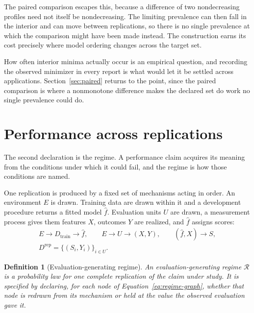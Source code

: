 \documentclass[11pt]{article}
\newcommand{\Regime}{\mathcal{R}}
\newtheorem{definition}{Definition}
\theoremstyle{remark}
\begin{document}
The paired comparison escapes this, because a difference of two nondecreasing profiles need not itself be nondecreasing. The limiting prevalence can then fall in the interior and can move between replications, so there is no single prevalence at which the comparison might have been made instead. The construction earns its cost precisely where model ordering changes across the target set.

How often interior minima actually occur is an empirical question, and recording the observed minimizer in every report is what would let it be settled across applications. Section~\ref{sec:paired} returns to the point, since the paired comparison is where a nonmonotone difference makes the declared set do work no single prevalence could do.

\section{Performance across replications}
\label{sec:regime}

The second declaration is the regime. A performance claim acquires its meaning from the conditions under which it could fail, and the regime is how those conditions are named.

One replication is produced by a fixed set of mechanisms acting in order. An environment $E$ is drawn. Training data are drawn within it and a development procedure returns a fitted model $\widehat f$. Evaluation units $U$ are drawn, a measurement process gives them features $X$, outcomes $Y$ are realized, and $\widehat f$ assigns scores:
\begin{equation}
\begin{gathered}
E\longrightarrow D_{\mathrm{train}}\longrightarrow\widehat f,
\qquad
E\longrightarrow U\longrightarrow(X,Y),
\qquad
(\widehat f,X)\longrightarrow S,
\\
D^{\mathrm{rep}}=\{(S_i,Y_i)\}_{i\in U}.
\end{gathered}
\label{eq:regime-graph}
\end{equation}

\begin{definition}[Evaluation-generating regime]
An evaluation-generating regime $\Regime$ is a probability law for one complete replication of the claim under study. It is specified by declaring, for each node of Equation~\eqref{eq:regime-graph}, whether that node is redrawn from its mechanism or held at the value the observed evaluation gave it.
\end{definition}
\end{document}
